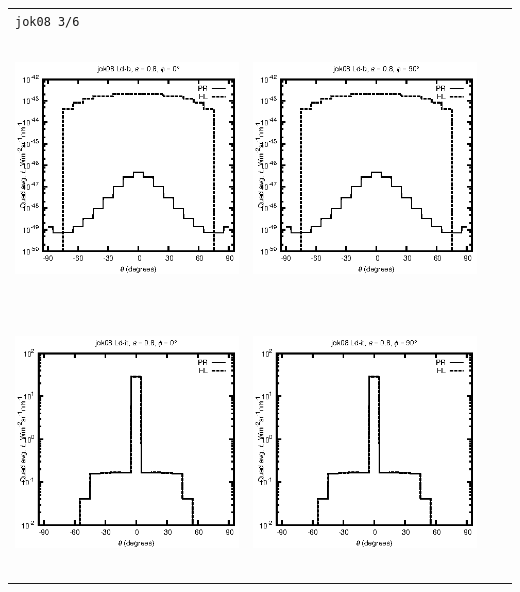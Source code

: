 \begin{tabular}{c c c c}
\multicolumn{4}{l}{\texttt{jok08 3/6}} \\
\includegraphics[height=7cm]{../eps/jok08_Ld_b_fwd.eps} &
\includegraphics[height=7cm]{../eps/jok08_Ld_b_cross.eps} \\
\includegraphics[height=7cm]{../eps/jok08_Ld_it_fwd.eps} &
\includegraphics[height=7cm]{../eps/jok08_Ld_it_cross.eps} \\

\end{tabular}
